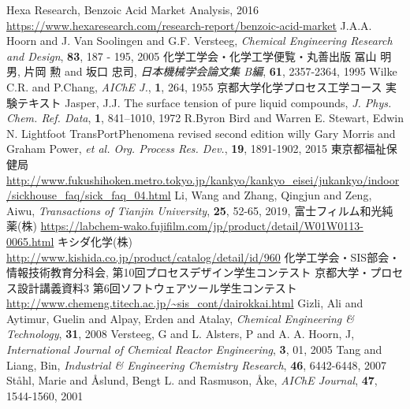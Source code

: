 \documentclass[a4j]{jsreport}
\begin{document}
\clearpage
\begin{thebibliography}{30}
     Hexa Research, Benzoic Acid Market Analysis, 2016 \url{https://www.hexaresearch.com/research-report/benzoic-acid-market}
    J.A.A. Hoorn and J. Van Soolingen and G.F. Versteeg, \textit{Chemical Engineering Research and Design}, \textbf{83}, 187 - 195, 2005
     化学工学会・化学工学便覧・丸善出版
    冨山 明男, 片岡 勲 and 坂口 忠司, \textit{日本機械学会論文集 B編}, \textbf{61}, 2357-2364, 1995
    Wilke C.R. and P.Chang, \textit{AIChE J.}, \textbf{1}, 264, 1955
     京都大学化学プロセス工学コース 実験テキスト
     Jasper, J.J. The surface tension of pure liquid compounds, \textit{J. Phys. Chem. Ref. Data}, \textbf{1}, 841–1010, 1972
     R.Byron Bird and Warren E. Stewart, Edwin N. Lightfoot TransPortPhenomena revised second edition willy
     Gary Morris and  Graham Power, \textit{et al.  Org. Process Res. Dev.}, \textbf{19}, 1891-1902, 2015
    東京都福祉保健局 \url{http://www.fukushihoken.metro.tokyo.jp/kankyo/kankyo_eisei/jukankyo/indoor/sickhouse_faq/sick_faq_04.html}
    Li, Wang and Zhang, Qingjun and Zeng, Aiwu, \textit{Transactions of Tianjin University}, \textbf{25}, 52-65, 2019,
     富士フィルム和光純薬(株) \url{https://labchem-wako.fujifilm.com/jp/product/detail/W01W0113-0065.html}
     キシダ化学(株) \url{http://www.kishida.co.jp/product/catalog/detail/id/960}
     化学工学会・SIS部会・情報技術教育分科会, 第10回プロセスデザイン学生コンテスト
     京都大学・プロセス設計講義資料3
     第6回ソフトウェアツール学生コンテスト \url{http://www.chemeng.titech.ac.jp/~sis_cont/dairokkai.html}
     Gizli, Ali and Aytimur, Guelin and Alpay, Erden and Atalay, \textit{Chemical Engineering \& Technology}, \textbf{31}, 2008
    Versteeg, G and L. Alsters, P and A. A. Hoorn, J, \textit{International Journal of Chemical Reactor Engineering}, \textbf{3}, 01, 2005
    Tang and Liang, Bin, \textit{Industrial \& Engineering Chemistry Research}, \textbf{46}, 6442-6448, 2007
    Ståhl, Marie and Åslund, Bengt L. and Rasmuson, Åke, \textit{AIChE Journal}, \textbf{47}, 1544-1560, 2001
\end{thebibliography}
\end{document}
